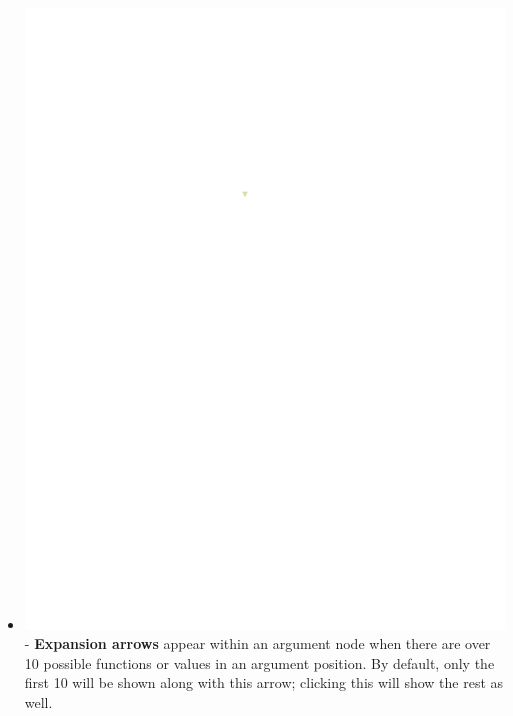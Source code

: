 \documentclass[conference]{IEEEtran}
\begin{document}
\begin{itemize}
		\item  \vspace{.25cm} \includegraphics{glossary-arrow} - \textbf{Expansion
			arrows} appear within an argument node when there are over 10 possible
		functions or values in an argument position. By default, only the first 10
		will be shown along with this arrow; clicking this will show the rest as well.
		

\end{itemize}
\end{document}
